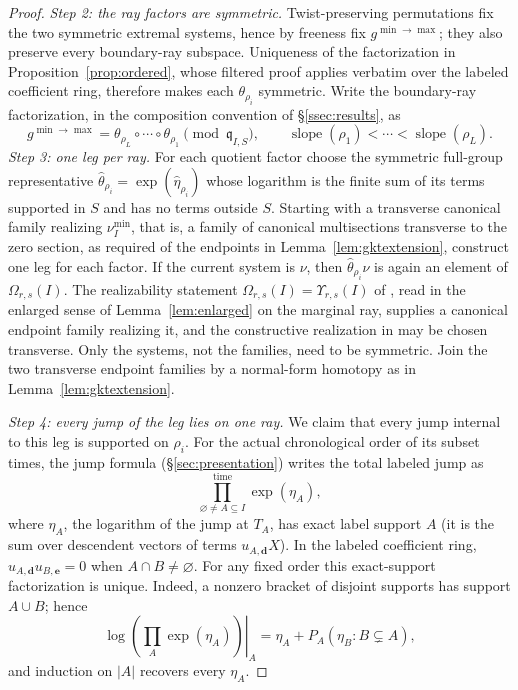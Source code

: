 \documentclass[11pt]{amsart}
\theoremstyle{definition}
\theoremstyle{remark}
\newcommand{\Om}{\Omega_{r,s}}
\begin{document}
\begin{proof}
\emph{Step 2: the ray factors are symmetric.}
Twist-preserving permutations fix the two symmetric extremal systems, hence by
freeness fix $g^{\min\to\max}$; they also preserve every boundary-ray
subspace. Uniqueness of the factorization in
Proposition~\ref{prop:ordered}, whose filtered proof applies verbatim
over the labeled coefficient ring, therefore makes each
$\theta_{\rho_i}$ symmetric.
Write the boundary-ray factorization, in the composition convention of
\S\ref{ssec:results}, as
\[
g^{\min\to\max}
=\theta_{\rho_L}\circ\cdots\circ\theta_{\rho_1}
\pmod{\mathfrak q_{I,S}},
\qquad \operatorname{slope}(\rho_1)<\cdots<
\operatorname{slope}(\rho_L).
\]
\emph{Step 3: one leg per ray.}
For each quotient factor choose the symmetric full-group representative
$\widehat\theta_{\rho_i}=\exp(\widehat\eta_{\rho_i})$ whose logarithm is the
finite sum of its terms supported in $S$ and has no terms outside $S$.
Starting with a transverse canonical family realizing $\nu_I^{\min}$, that
is, a family of canonical multisections \cite[Def.~3.22]{GKT} transverse to
the zero section, as required of the endpoints in Lemma~\ref{lem:gktextension},
construct one leg for each factor. If the current system is $\nu$, then
$\widehat\theta_{\rho_i}\nu$ is again an element of $\Om(I)$. The
realizability statement $\Om(I)=\Upsilon_{r,s}(I)$ of \cite[Cor.~5.14]{GKT},
read in the enlarged sense of Lemma~\ref{lem:enlarged} on the marginal ray,
supplies a canonical endpoint family realizing it, and the constructive
realization in \cite[Thm.~5.13, Lem.~5.15]{GKT} may be chosen transverse.
Only the systems, not the families, need to be symmetric. Join the two
transverse endpoint families by a normal-form homotopy as in
Lemma~\ref{lem:gktextension}.

\emph{Step 4: every jump of the leg lies on one ray.}
We claim that every jump internal to this leg is supported on $\rho_i$.
For the actual chronological order of its subset times, the jump formula
(\S\ref{sec:presentation}) writes the total labeled jump as
\[
\prod_{\varnothing\ne A\subseteq I}^{\mathrm{time}}\exp(\eta_A),
\]
where $\eta_A$, the logarithm of the jump at $T_A$, has exact label support
$A$ (it is the sum over descendent vectors of terms $u_{A,\mathbf d}X$). In the labeled coefficient ring,
$u_{A,\mathbf d}u_{B,\mathbf e}=0$ when $A\cap B\ne\varnothing$.
For any fixed order this exact-support factorization is unique. Indeed,
a nonzero bracket of disjoint supports has support $A\cup B$; hence
\[
\left.\log\!\left(\prod_A\exp(\eta_A)\right)\right|_A
=\eta_A+P_A(\eta_B:B\subsetneq A),
\]
and induction on $\lvert A\rvert$ recovers every $\eta_A$.


\end{proof}
\end{document}
